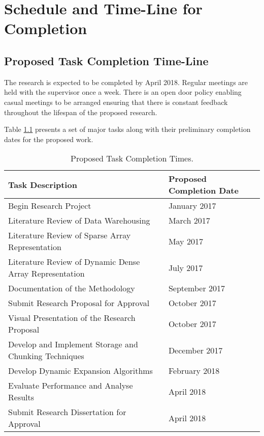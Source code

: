 %
%
%
%
%
\chapter{Schedule and Time-Line for Completion} \label{chap:schedule}
\vspace{-1cm}

\section{Proposed Task Completion Time-Line}
The research is expected to be completed by April 2018. Regular meetings are held with the supervisor once a week. There is an open door policy enabling casual meetings to be arranged  ensuring that there is constant feedback throughout the lifespan of the proposed research. 

Table \ref{tab:timeline} presents a set of major tasks along with their preliminary completion dates for the proposed work.

\begin{table}[H]
	\caption{Proposed Task Completion Times.\label{tab:timeline}}
	\begin{center}
		\begin{tabular}{|l|l|}
		\hline 
		\textbf{Task Description} & \textbf{Proposed Completion Date} \\ 
		\hline 
	 	Begin Research Project & January 2017\\
	 	Literature Review of Data Warehousing & March 2017\\
	 	Literature Review of Sparse Array Representation & May 2017\\
	 	Literature Review of Dynamic Dense Array Representation & July 2017\\
	 	Documentation of the Methodology & September 2017\\
	 	Submit Research Proposal for Approval & October 2017\\
	 	Visual Presentation of the Research Proposal & October 2017 \\
	 	Develop and Implement Storage and Chunking Techniques & December 2017\\
	 	Develop Dynamic Expansion Algorithms & February 2018\\
		Evaluate Performance and Analyse Results & April 2018\\
		Submit Research Dissertation for Approval & April 2018\\
		\hline 
		\end{tabular} 
	\end{center}
\end{table}